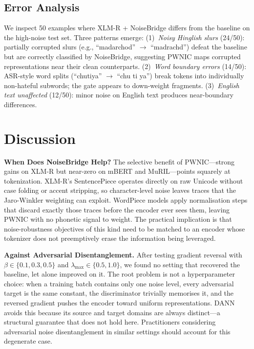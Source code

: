 \documentclass[conference]{IEEEtran}
\begin{document}
\subsection{Error Analysis}

We inspect 50 examples where XLM-R + NoiseBridge differs from the baseline on the high-noise test set. Three patterns emerge: (1)~\textit{Noisy Hinglish slurs} (24/50): partially corrupted slurs (e.g., ``madarchod'' $\to$ ``madrachd'') defeat the baseline but are correctly classified by NoiseBridge, suggesting PWNIC maps corrupted representations near their clean counterparts. (2)~\textit{Word boundary errors} (14/50): ASR-style word splits (``chutiya'' $\to$ ``chu ti ya'') break tokens into individually non-hateful subwords; the gate appears to down-weight fragments. (3)~\textit{English text unaffected} (12/50): minor noise on English text produces near-boundary differences.

\section{Discussion}
\label{sec:discussion}

\textbf{When Does NoiseBridge Help?}
The selective benefit of PWNIC---strong gains on XLM-R but near-zero on mBERT and MuRIL---points squarely at tokenization. XLM-R's SentencePiece operates directly on raw Unicode without case folding or accent stripping, so character-level noise leaves traces that the Jaro-Winkler weighting can exploit. WordPiece models apply normalisation steps that discard exactly those traces before the encoder ever sees them, leaving PWNIC with no phonetic signal to weight. The practical implication is that noise-robustness objectives of this kind need to be matched to an encoder whose tokenizer does not preemptively erase the information being leveraged.

\textbf{Against Adversarial Disentanglement.}
After testing gradient reversal with $\beta \in \{0.1, 0.3, 0.5\}$ and $\lambda_{\max} \in \{0.5, 1.0\}$, we found no setting that recovered the baseline, let alone improved on it. The root problem is not a hyperparameter choice: when a training batch contains only one noise level, every adversarial target is the same constant, the discriminator trivially memorises it, and the reversed gradient pushes the encoder toward uniform representations. DANN~\cite{ganin2016domain} avoids this because its source and target domains are always distinct---a structural guarantee that does not hold here. Practitioners considering adversarial noise disentanglement in similar settings should account for this degenerate case.
\end{document}
